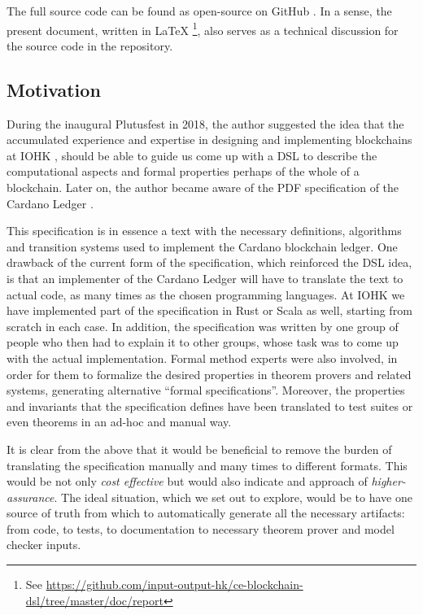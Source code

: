 \documentclass[11pt]{article}
\begin{document}
The full source code can be found as open-source on GitHub \cite{repo:code}. In a sense, the present document, written in \LaTeX%
\footnote{See \href{https://github.com/input-output-hk/ce-blockchain-dsl/tree/master/doc/report}{https://github.com/input-output-hk/ce-blockchain-dsl/tree/master/doc/report}}, also serves as a technical discussion for the source code in the repository.

\subsection{Motivation}
\label{sec:motivation}


During the inaugural Plutusfest \cite{site:plutusfest} in 2018, the author suggested the idea that the accumulated experience and expertise in designing and implementing blockchains at IOHK \cite{site:iohk}, should be able to guide us come up with a DSL to describe the computational aspects and formal properties perhaps of the whole of a blockchain. Later on, the author became aware of the PDF specification of the Cardano Ledger \cite{cardano:ledger-spec:shelley:2019}.

This specification is in essence a text with the necessary definitions, algorithms and transition systems used to implement the Cardano blockchain ledger. One drawback of the current form of the specification, which reinforced the DSL idea, is that an implementer of the Cardano Ledger will have to translate the text to actual code, as many times as the chosen programming languages. At IOHK we have implemented part of the specification in Rust or Scala as well, starting from scratch in each case. In addition, the specification was written by one group of people who then had to explain it to other groups, whose task was to come up with the actual implementation. Formal method experts were also involved, in order for them to formalize the desired properties in theorem provers and related systems, generating alternative ``formal specifications''. Moreover, the properties and invariants that the specification defines have been translated to test suites or even theorems in an ad-hoc and manual way.

It is clear from the above that it would be beneficial to remove the burden of translating the specification manually and many times to different formats. This would be not only \textit{cost effective} but would also indicate and approach of \textit{higher-assurance}. The ideal situation, which we set out to explore, would be to have one source of truth from which to automatically generate all the necessary artifacts: from code, to tests, to documentation to necessary theorem prover and model checker inputs.
\end{document}
